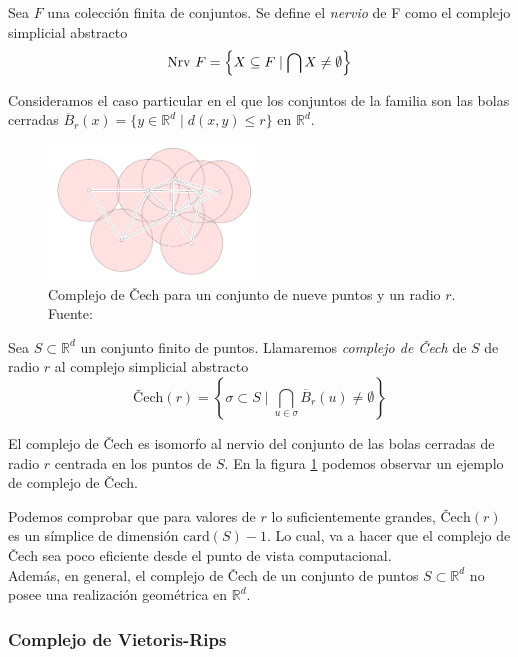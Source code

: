 \begin{definition}
Sea $F$ una colección finita de conjuntos. Se define el \emph{nervio} de F como el complejo simplicial abstracto
\[
{\rm Nrv}\ F= \left\{ X \subseteq F \mid \bigcap X \neq \emptyset \right\}
\]
\end{definition}

Consideramos el caso particular en el que los conjuntos de la familia son las bolas cerradas $\overline{B}_r(x)= \{y\in \mathbb{R}^d \mid d(x,y) \leq r\}$ en $\mathbb{R}^d$.

\begin{figure}[!ht]
\centering
\includegraphics[width=0.5\textwidth]{include/figuras/Cech.png} 
\caption{Complejo de \v{C}ech para un conjunto de nueve puntos y un radio $r$. Fuente: \cite{libroEH}}
\label{ref:cech}
\end{figure}

\begin{definition}
Sea $S\subset \mathbb{R}^d$ un conjunto finito de puntos. Llamaremos \emph{complejo de \v{C}ech} de $S$ de radio $r$ al complejo simplicial abstracto
\[
\text{\v{C}ech}(r)=\left\{\sigma \subset S \mid \bigcap_{u \in \sigma} \overline{B}_r(u)\neq \emptyset \right\}
\]
\end{definition}

El complejo de \v{C}ech es isomorfo al nervio del conjunto de las bolas cerradas de radio $r$ centrada en los puntos de $S$. En la figura \ref{ref:cech} podemos observar un ejemplo de complejo de \v{C}ech.

Podemos comprobar \cite{libroEH} que para valores de $r$ lo suficientemente grandes, $\text{\v{C}ech}(r)$ es un símplice de dimensión $\text{card}(S)-1$. Lo cual, va a hacer que el complejo de \v{C}ech sea poco eficiente desde el punto de vista computacional.\\
Además, en general, el complejo de \v{C}ech de un conjunto de puntos $S \subset \mathbb{R}^d$ no posee una realización geométrica en $\mathbb{R}^d$.



\subsubsection*{Complejo de Vietoris-Rips}

